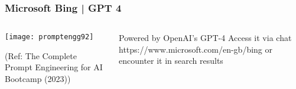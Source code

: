 		


\begin{frame}[fragile]\frametitle{Microsoft Bing | GPT 4}


\begin{columns}
    \begin{column}[T]{0.6\linewidth}
		\begin{center}
		\texttt{[image: promptengg92]}

		{\tiny (Ref: The Complete Prompt Engineering for AI Bootcamp (2023))}
		\end{center}	
    \end{column}
    \begin{column}[T]{0.4\linewidth}
		Powered by OpenAI’s GPT-4
		Access it via chat https://www.microsoft.com/en-gb/bing or encounter it in search results
    \end{column}
  \end{columns}
\end{frame}







